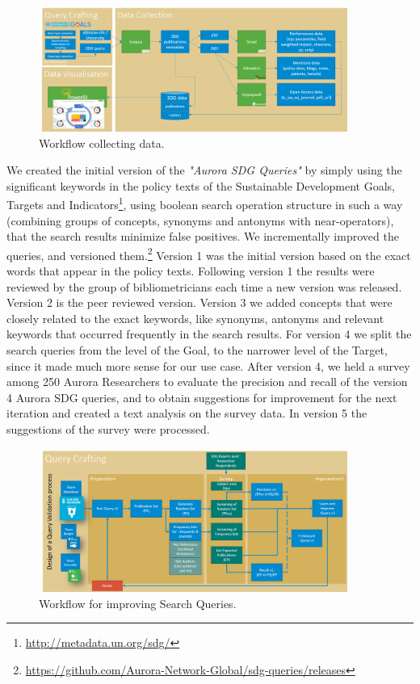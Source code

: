 \documentclass{article}
\begin{document}
\begin{figure}[ht]
	\centering
  \includegraphics[width=0.9\textwidth]{figures/sdg-data-workflow.png}
	\caption{Workflow collecting data.}
	\label{sdgdataworkflow}
\end{figure}

We created the initial version of the \emph{"Aurora SDG Queries"} by simply using the significant keywords in the policy texts of the Sustainable Development Goals, Targets and Indicators\footnote{\url{http://metadata.un.org/sdg/}}, using boolean search operation structure in such a way (combining groups of concepts, synonyms and antonyms with near-operators), that the search results minimize false positives. We incrementally improved the queries, and versioned them.\footnote{\url{https://github.com/Aurora-Network-Global/sdg-queries/releases}} Version 1 was the initial version based on the exact words that appear in the policy texts. Following version 1 the results were reviewed by the group of bibliometricians each time a new version was released. Version 2 is the peer reviewed version. Version 3 we added concepts that were closely related to the exact keywords, like synonyms, antonyms and relevant keywords that occurred frequently in the search results. For version 4 \cite{vanderfeesten_search_2019} we split the search queries from the level of the Goal, to the narrower level of the Target, since it made much more sense for our use case. After version 4, we held a survey \cite{vanderfeesten_survey_2020} among 250 Aurora Researchers to evaluate the precision and recall of the version 4 Aurora SDG queries, and to obtain suggestions for improvement for the next iteration and created a text analysis \cite{vanderfeesten_text_2020} on the survey data. In version 5 \cite{vanderfeesten_search_2020} the suggestions of the survey were processed. 

\begin{figure}[ht]
	\centering
  \includegraphics[width=0.9\textwidth]{figures/sdg-query-crafting.png}
	\caption{Workflow for improving Search Queries.}
	\label{improvingsearchqueries}
\end{figure}
\end{document}
